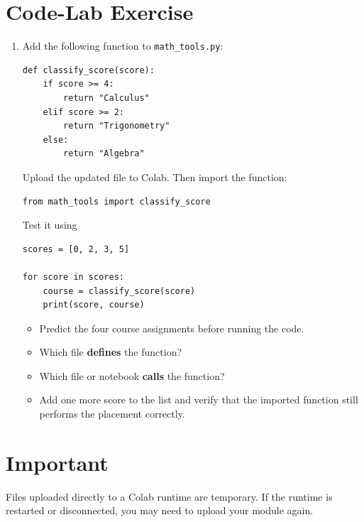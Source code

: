 \documentclass{article}
\begin{document}
\section{Code-Lab Exercise}

\begin{enumerate}

\item Add the following function to
\texttt{math\_tools.py}:

\begin{verbatim}
def classify_score(score):
    if score >= 4:
        return "Calculus"
    elif score >= 2:
        return "Trigonometry"
    else:
        return "Algebra"
\end{verbatim}

Upload the updated file to Colab.  Then import the function:

\begin{verbatim}
from math_tools import classify_score
\end{verbatim}

Test it using

\begin{verbatim}
scores = [0, 2, 3, 5]

for score in scores:
    course = classify_score(score)
    print(score, course)
\end{verbatim}

\begin{itemize}

\item Predict the four course assignments before running the code.

\item Which file \textbf{defines} the function?

\item Which file or notebook \textbf{calls} the function?

\item Add one more score to the list and verify that the imported
function still performs the placement correctly.

\end{itemize}

\end{enumerate}


\section{Important}

Files uploaded directly to a Colab runtime are temporary.  If the
runtime is restarted or disconnected, you may need to upload your
module again.
\end{document}
